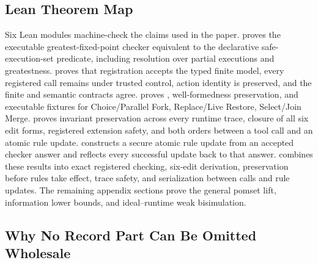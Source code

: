 \subsection{Lean Theorem Map}
\label{app:lean-map}

Six Lean modules machine-check the claims used in the paper.
 proves the executable greatest-fixed-point checker equivalent to the declarative safe-execution-set predicate, including resolution over partial executions and greatestness.
 proves that registration accepts the typed finite model, every registered call remains under trusted control, action identity is preserved, and the finite and semantic contracts agree.
 proves , well-formedness preservation, and executable fixtures for Choice/Parallel Fork, Replace/Live Restore, Select/Join Merge.
 proves invariant preservation across every runtime trace, closure of all six edit forms, registered extension safety, and both orders between a tool call and an atomic rule update.
 constructs a secure atomic rule update from an accepted checker answer and reflects every successful update back to that answer.
 combines these results into exact registered checking, six-edit derivation, preservation before rules take effect, trace safety, and serialization between calls and rule updates.
The remaining appendix sections prove the general pomset lift, information lower bounds, and ideal--runtime weak bisimulation.

\subsection{Why No Record Part Can Be Omitted Wholesale}
\label{app:record-information}

